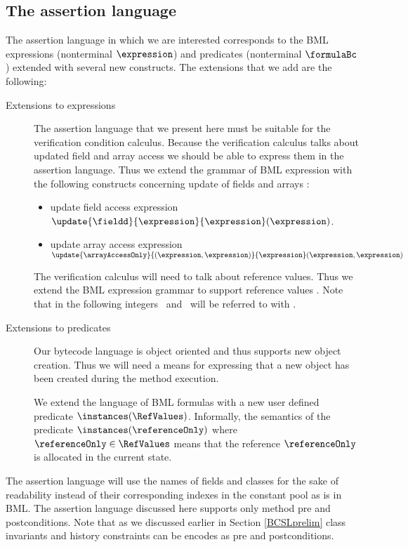 \subsection{The assertion language} \label{assertLang:lang}
The assertion language in which we are interested corresponds to the
BML  expressions (nonterminal $\expression$) and predicates 
(nonterminal $\formulaBc$) extended with several new constructs.
 The extensions that we add are the following:
\begin{description}
    \item [Extensions to expressions] 
         The assertion language that we present here must be suitable for the verification condition calculus.
	 Because the verification calculus talks about updated field and array access
	 we should be able  to express  them in the assertion language. Thus we extend the grammar of BML expression
	 with the following constructs concerning update of fields and arrays :

        \begin{itemize}
	       \item update field access expression 
		  $\update{\fieldd}{ \expression}{\expression}(\expression)$.

	       \item update array access expression 
                   $ \update{ \arrayAccessOnly}{ (\expression , \expression)}{ \expression} (\expression,\expression)$
	\end{itemize}

	The verification calculus will need to talk about reference values. Thus we extend the BML expression grammar to  support
	reference values \RefValues. Note that in the following integers \Myint\  and \RefValues \ will be referred to with \Values.
    \item [Extensions to predicates] Our bytecode language is object oriented and thus supports new object creation. Thus we
          will need a means for expressing that a new object has been created during the method execution. 

	  We extend the language of BML  formulas
	  with a new user defined predicate $ \instances(\RefValues)$. Informally, the semantics of the predicate
	  $\instances(\referenceOnly)$ where $\referenceOnly \in \RefValues$
	  means that the reference $\referenceOnly  $  is allocated in the current state.
        
\end{description}

The assertion language will use the names of fields and classes for the sake of readability instead of their corresponding indexes
in the constant pool as is in BML. 
The assertion language discussed here supports only method pre and postconditions. Note that as we discussed earlier in 
Section \ref{BCSLprelim}
class invariants and history constraints can be encodes as pre and postconditions. 
